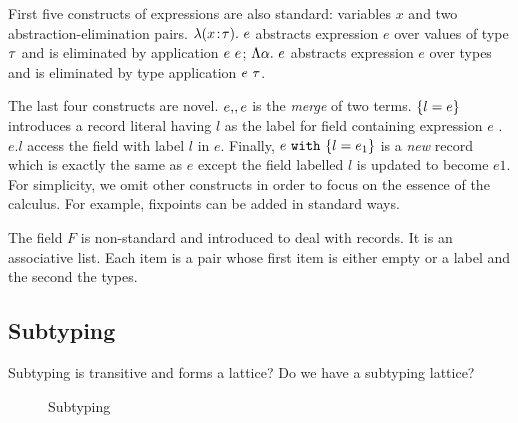 First five constructs of expressions are also standard: variables $ x $ and two
abstraction-elimination pairs. $ \lambda (x \!:\! \tau).~ e $ abstracts expression
$ e $ over values of type $ \tau $ and is eliminated by application $ {e} ~ {e} $;
$ \Lambda \alpha.~ e $ abstracts expression $ e $ over types and is eliminated by
type application $ {e} ~ {\tau} $.

The last four constructs are novel. $ e ,\!, e $ is the \emph{merge} of two
terms. $ \{ l = e \} $ introduces a record literal having $ l $ as the
label for field containing expression $ e $ . $ e.l $ access the field with
label $ l $ in $ e $. Finally, $ e ~ \texttt{with} ~ \{ l = e_1 \} $ is a \emph{new}
record which is exactly the same as $ e $ except the field labelled $ l $ is
updated to become $ e1 $. For simplicity, we omit other constructs in order to
focus on the essence of the calculus. For example, fixpoints can be added in
standard ways.

The field $ F $ is non-standard and introduced to deal with records. It is an
associative list. Each item is a pair whose first item is either empty or a
label and the second the types.




\subsection{Subtyping}

Subtyping is transitive and forms a lattice?
Do we have a subtyping lattice?

\begin{figure}

\caption{Subtyping}
\end{figure}


